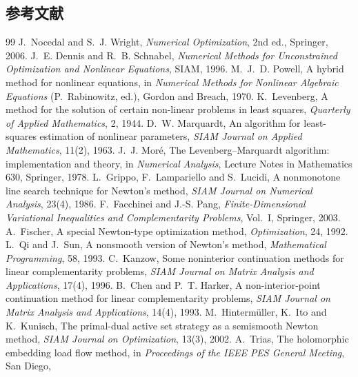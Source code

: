 \subsection{参考文献}
{\renewcommand{\section}[2]{}%
\begin{thebibliography}{99}\small
{} J.~Nocedal and S.~J. Wright, \emph{Numerical
Optimization}, 2nd ed., Springer, 2006.
 J.~E. Dennis and R.~B. Schnabel, \emph{Numerical
Methods for Unconstrained Optimization and Nonlinear Equations}, SIAM,
1996.
 M.~J.~D. Powell, A hybrid method for nonlinear
equations, in \emph{Numerical Methods for Nonlinear Algebraic Equations}
(P.~Rabinowitz, ed.), Gordon and Breach, 1970.
 K.~Levenberg, A method for the solution of
certain non-linear problems in least squares, \emph{Quarterly of Applied
Mathematics}, 2, 1944.
 D.~W. Marquardt, An algorithm for least-squares
estimation of nonlinear parameters, \emph{SIAM Journal on Applied
Mathematics}, 11(2), 1963.
 J.~J. Mor\'e, The Levenberg--Marquardt algorithm:
implementation and theory, in \emph{Numerical Analysis}, Lecture Notes in
Mathematics 630, Springer, 1978.
 L.~Grippo, F.~Lampariello and S.~Lucidi, A nonmonotone
line search technique for Newton's method, \emph{SIAM Journal on Numerical
Analysis}, 23(4), 1986.
 F.~Facchinei and J.-S. Pang, \emph{Finite-Dimensional
Variational Inequalities and Complementarity Problems}, Vol.~I, Springer,
2003.
 A.~Fischer, A special Newton-type optimization
method, \emph{Optimization}, 24, 1992.
 L.~Qi and J.~Sun, A nonsmooth version of Newton's
method, \emph{Mathematical Programming}, 58, 1993.
 C.~Kanzow, Some noninterior continuation methods
for linear complementarity problems, \emph{SIAM Journal on Matrix Analysis
and Applications}, 17(4), 1996.
 B.~Chen and P.~T. Harker, A non-interior-point
continuation method for linear complementarity problems, \emph{SIAM Journal
on Matrix Analysis and Applications}, 14(4), 1993.
 M.~Hinterm\"uller, K.~Ito and K.~Kunisch, The
primal-dual active set strategy as a semismooth Newton method,
\emph{SIAM Journal on Optimization}, 13(3), 2002.
 A.~Trias, The holomorphic embedding load flow
method, in \emph{Proceedings of the IEEE PES General Meeting}, San Diego,

\end{thebibliography}}
